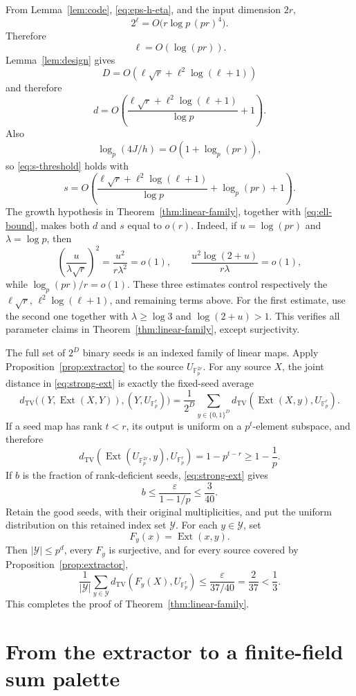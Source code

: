 \documentclass[11pt]{article}
\numberwithin{equation}{section}
\theoremstyle{definition}
\theoremstyle{remark}
\newcommand{\F}{\mathbb F}
\newcommand{\TV}{d_{\mathrm{TV}}}
\newcommand{\Ext}{\operatorname{Ext}}
\begin{document}
From Lemma~\ref{lem:code}, \eqref{eq:eps-h-eta}, and the input dimension
$2r$,
\[
 2^\ell=O\bigl(r\log p\,(pr)^4\bigr).
\]
Therefore
\begin{equation}\label{eq:ell-bound}
 \ell=O(\log(pr)).
\end{equation}
Lemma~\ref{lem:design} gives
\[
 D=O\left(\ell\sqrt r+\ell^2\log(\ell+1)\right)
\]
and therefore
\[
 d=O\left(
 \frac{\ell\sqrt r+\ell^2\log(\ell+1)}{\log p}+1\right).
\]
Also
\[
 \log_p(4J/h)=O(1+\log_p(pr)),
\]
so \eqref{eq:s-threshold} holds with
\[
 s=O\left(
 \frac{\ell\sqrt r+\ell^2\log(\ell+1)}{\log p}
 +\log_p(pr)+1\right).
\]
The growth hypothesis in Theorem~\ref{thm:linear-family}, together with
\eqref{eq:ell-bound}, makes both $d$ and $s$ equal to $o(r)$.
Indeed, if $u=\log(pr)$ and $\lambda=\log p$, then
\[
 \left(\frac{u}{\lambda\sqrt r}\right)^2
 =\frac{u^2}{r\lambda^2}=o(1),
 \qquad
 \frac{u^2\log(2+u)}{r\lambda}=o(1),
\]
while $\log_p(pr)/r=o(1)$.  These three estimates control respectively
the $\ell\sqrt r$, $\ell^2\log(\ell+1)$, and remaining terms above.
For the first estimate, use the second one together with
$\lambda\ge\log3$ and $\log(2+u)>1$.
This verifies all parameter claims in
Theorem~\ref{thm:linear-family}, except surjectivity.

The full set of $2^D$ binary seeds is an indexed family of linear maps.  Apply
Proposition~\ref{prop:extractor} to the source $U_{\F_p^{2r}}$.
For any source $X$, the joint distance in \eqref{eq:strong-ext} is exactly
the fixed-seed average
\[
 \TV\bigl((Y,\Ext(X,Y)),(Y,U_{\F_p^r})\bigr)
 =\frac1{2^D}\sum_{y\in\{0,1\}^D}
 \TV(\Ext(X,y),U_{\F_p^r}).
\]
If a seed map has rank $t<r$, its output is uniform on a $p^t$-element
subspace, and therefore
\[
 \TV(\Ext(U_{\F_p^{2r}},y),U_{\F_p^r})
 =1-p^{t-r}\ge1-\frac1p.
\]
If $b$ is the fraction of rank-deficient seeds, \eqref{eq:strong-ext}
gives
\[
 b\le\frac{\varepsilon}{1-1/p}\le\frac3{40}.
\]
Retain the good seeds, with their original multiplicities, and put the
uniform distribution on this retained index set $\mathcal Y$.  For each
$y\in\mathcal Y$, set
\[
 F_y(x)=\Ext(x,y).
\]
Then $|\mathcal Y|\le p^d$, every $F_y$ is surjective, and for every
source covered by Proposition~\ref{prop:extractor},
\[
 \frac1{|\mathcal Y|}\sum_{y\in\mathcal Y}
 \TV(F_y(X),U_{\F_p^r})
 \le\frac{\varepsilon}{37/40}=\frac2{37}<\frac13.
\]
This completes the proof of Theorem~\ref{thm:linear-family}.

\section{From the extractor to a finite-field sum palette}
\label{sec:group-palette}
\end{document}
